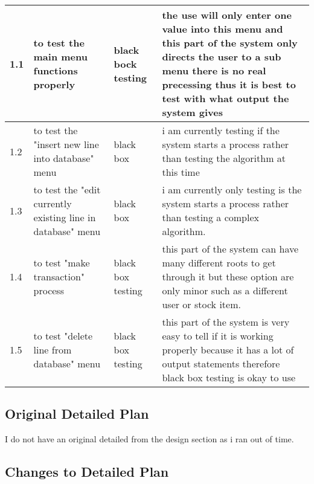 \begin{landscape}
\begin{center}
\begin{tabular}{|p{2cm}|p{5cm}|p{5cm}|p{4cm}|}
1.1 & to test the main menu functions properly  & black bock testing & the use will only enter one value into this menu and this part of the system only directs the user to a sub menu there is no real precessing thus it is best to test with what output the system gives \\ \hline
1.2 &to test the "insert new line into database" menu & black box & i am currently testing if the system starts a process rather than testing the algorithm at this time\\ \hline
1.3 & to test the "edit currently existing line in database" menu & black box &  i am currently only testing is the system starts a process rather than testing a complex algorithm. \\ \hline
1.4 & to test "make transaction" process & black box testing & this part of the system can have many different roots to get through it but these option are only minor such as a different user or stock item. \\ \hline
1.5 & to test "delete line from database" menu & black box testing & this part of the system is very easy to tell if it is working properly because it has a lot of output statements therefore black box testing is okay to use \\ \hline
    \end{tabular}
\end{center}

\subsection{Original Detailed Plan}

I do not have an original detailed from the design section as i ran out of time.

\subsection{Changes to Detailed Plan}


\end{landscape}
